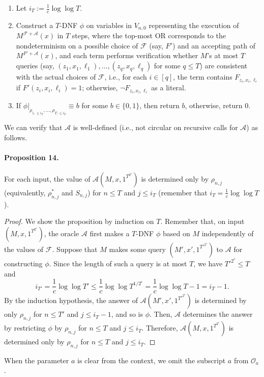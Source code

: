 \begin{enumerate}
\begin{enumerate}
\item Let $i_T:=\frac1c\log\log T$.
\item Construct a $T$-DNF $\phi$ on variables in $V_{n,0}$ representing the execution of $M^{\mathcal F+\mathcal A}(x)$ in $T$ steps, where the top-most OR corresponds to the nondeterminism on a possible choice of $\mathcal F$ (say, $F'$) and an accepting path of $M^{F'+\mathcal A}(x)$, and each term performs verification whether $M$'s at most $T$ queries (say, $(z_1,x_1,\ell_1),\ldots,(z_q,x_q,\ell_q)$ for some $q\leq T$) are consistent with the actual choices of $\mathcal F$, i.e., for each $i\in[q]$, the term contains $F_{z_i,x_i,\ell_i}$ if $F'(z_i,x_i,\ell_i)=1$; otherwise, $\neg F_{z_i,x_i,\ell_i}$ as a literal.
\item If $\phi|_{\rho_{1,\leq i_T},\ldots,\rho_{T,\leq i_T}}\equiv b$ for some $b\in\{0,1\}$, then return $b$, otherwise, return 0.
\end{enumerate}
\end{enumerate}
We can verify that $\mathcal A$ is well-defined (i.e., not circular on recursive calls for $\mathcal A$) as follows.
\paragraph{Proposition 14.}
For each input, the value of $\mathcal A(M,x,1^{T^{2^c}})$ is determined only by $\rho_{n,j}$ (equivalently, $\rho^*_{n,j}$ and $S_{n,j}$) for $n\leq T$ and $j\leq i_T$ (remember that $i_T=\frac1c\log\log T$).
\begin{proof}
We show the proposition by induction on $T$. Remember that, on input $(M,x,1^{T^{2^c}})$, the oracle $\mathcal A$ first makes a $T$-DNF $\phi$ based on $M$ independently of the values of $\mathcal F$.
Suppose that $M$ makes some query $(M',x',1^{T'^{2^c}})$ to $\mathcal A$ for constructing $\phi$. Since the length of such a query is at most $T$, we have $T'^{2^c}\leq T$ and
\[i_{T'}=\frac1c\log\log T'\leq\frac1c\log\log T^{1/2^c}=\frac1c\log\log T-1=i_T-1.\]
By the induction hypothesis, the answer of $\mathcal A(M',x',1^{T'^{2^c}})$ is determined by only $\rho_{n,j}$ for $n\leq T'$ and $j\leq i_T-1$, and so is $\phi$. Then, $\mathcal A$ determines the answer by restricting $\phi$ by $\rho_{n,j}$ for $n\leq T$ and $j\leq i_T$. Therefore, $\mathcal A(M,x,1^{T^{2^c}})$ is determined only by $\rho_{n,j}$ for $n\leq T$ and $j\leq i_T$.
\end{proof}
When the parameter $a$ is clear from the context, we omit the subscript $a$ from $\mathcal O_a$.
